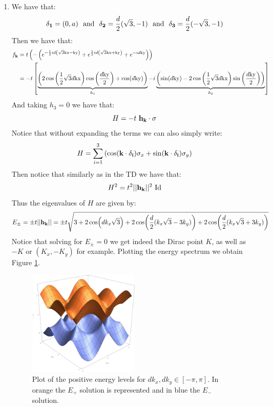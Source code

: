 \documentclass[10pt,a4paper]{article}
\begin{document}
\begin{enumerate}
\item  We have that:
\[
\vb{\delta_1} = (0, a) \mbox{~~and~~} \vb{\delta_2} = \frac{d}{2} (\sqrt{3}, -1) \mbox{~~and~~} \vb{\delta_3} = \frac{d}{2} (-\sqrt{3}, -1)
\]
Then we have that:
\begin{align*}
f_{\vb{k}} &= t \left(-\left(e^{-\frac{1}{2} i d \left(\sqrt{3} \text{kx}-\text{ky}\right)}+e^{\frac{1}{2}
   i d \left(\sqrt{3} \text{kx}+\text{ky}\right)}+e^{-i d \text{ky}}\right)\right)\\
&= -t \left[
\underbrace{\left(2 \cos \left(\frac{1}{2} \sqrt{3} d \text{kx}\right) \cos \left(\frac{d
   \text{ky}}{2}\right)+\cos (d \text{ky})\right)}_{h_1} - i \underbrace{\left(\sin (d \text{ky})-2 \cos \left(\frac{1}{2} \sqrt{3} d \text{kx}\right) \sin
   \left(\frac{d \text{ky}}{2}\right)\right)}_{h_2}
\right]
\end{align*}
And taking $h_3 = 0$ we have that:
\[
H = -t \, \, \vb{h}_{\vb{k}} \cdot \vb{\sigma}
\]
Notice that without expanding the terms we can also simply write:
\[
H = \sum_{i = 1}^3 \left( \cos(\vb{k} \cdot \vb{\delta_i} ) \sigma_x + \sin(\vb{k} \cdot \vb{\delta_i}) \sigma_y \right)
\]
Then notice that similarly as in the TD we have that:
\[
H^2 = t^2 || \vb{h}_{\vb{k}} ||^2 \text{ Id}
\]
Thus the eigenvalues of $H$ are given by:
\[
E_\pm = \pm t || \vb{h_{\vb{k}}} || = \pm t \sqrt{3 + 2 \cos(d k_x \sqrt{3}) + 2 \cos(\frac{d}{2} (k_x\sqrt{3} - 3 k_y)) + 2 \cos(\frac{d}{2}(k_x\sqrt{3} + 3k_y))}
\]
Notice that solving for $E_\pm = 0$ we get indeed the Dirac point $K$, as well as $-K$ or $(K_x, - K_y)$ for example. Plotting the energy spectrum we obtain Figure \ref{eigenplot}.
\begin{figure}
\centering
\includegraphics[width = 0.5\textwidth]{energylevels}
\caption{Plot of the positive energy levels for $d k_x, d k_y \in [-\pi, \pi]$. In orange the $E_+$ solution is represented and in blue the $E_-$ solution.} \label{eigenplot}
\end{figure}


\end{enumerate}
\end{document}
